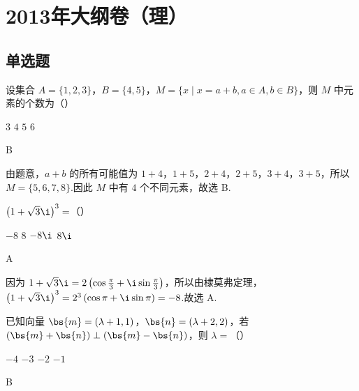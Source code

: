 \chapter{2013年大纲卷（理）}

\section{单选题}

\begin{problem}
设集合 \(A = \{1, 2, 3\}\)，\(B = \{4, 5\}\)，\(M = \{x \mid x = a + b, a \in A, b \in B\}\)，则 \(M\) 中元素的个数为（\quad）

\choices
    {\(3\)}
    {\(4\)}
    {\(5\)}
    {\(6\)}
\end{problem}

\begin{answer}
B
\end{answer}

\begin{solution}
由题意，\(a+b\) 的所有可能值为 \(1+4\)，\(1+5\)，\(2+4\)，\(2+5\)，\(3+4\)，\(3+5\)，所以 \(M=\{5,6,7,8\}\).因此 \(M\) 中有 \(4\) 个不同元素，故选 B.
\end{solution}

\begin{problem}
\(\left(1 + \sqrt{3}\i\right)^3 =\)（\quad）

\choices
    {\(-8\)}
    {\(8\)}
    {\(-8\i\)}
    {\(8\i\)}
\end{problem}

\begin{answer}
A
\end{answer}

\begin{solution}
因为 \(1+\sqrt{3}\i=2\left(\cos\frac{\pi}{3}+\i\sin\frac{\pi}{3}\right)\)，所以由棣莫弗定理，\(\left(1+\sqrt{3}\i\right)^3=2^3\left(\cos\pi+\i\sin\pi\right)=-8\).故选 A.
\end{solution}

\begin{problem}
已知向量 \(\bs{m} = (\lambda + 1, 1)\)，\(\bs{n} = (\lambda + 2, 2)\)，若 \((\bs{m} + \bs{n}) \perp (\bs{m} - \bs{n})\)，则 \(\lambda =\)（\quad）

\choices
    {\(-4\)}
    {\(-3\)}
    {\(-2\)}
    {\(-1\)}
\end{problem}

\begin{answer}
B
\end{answer}

